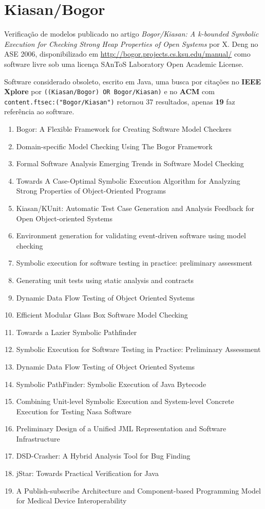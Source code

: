 \section{Kiasan/Bogor}

Verificação de modelos
publicado no artigo {\it Bogor/Kiasan: A k-bounded Symbolic Execution for Checking Strong Heap Properties of Open Systems}
por X. Deng
no ASE 2006,
disponibilizado em \url{http://bogor.projects.cs.ksu.edu/manual/}
como software livre
sob uma licença SAnToS Laboratory Open Academic License.

Software considerado obsoleto,
escrito em Java,
uma busca por citações no {\bf IEEE Xplore} por
\texttt{((Kiasan/Bogor) OR Bogor/Kiasan)}
e no {\bf ACM} com
\texttt{content.ftsec:("Bogor/Kiasan")}
retornou
37 resultados, apenas
{\bf 19} faz referência ao software.

\begin{enumerate}
\item Bogor: A Flexible Framework for Creating Software Model Checkers
\item Domain-specific Model Checking Using The Bogor Framework
\item Formal Software Analysis Emerging Trends in Software Model Checking
\item Towards A Case-Optimal Symbolic Execution Algorithm for Analyzing Strong Properties of Object-Oriented Programs
\item Kiasan/KUnit: Automatic Test Case Generation and Analysis Feedback for Open Object-oriented Systems
\item Environment generation for validating event-driven software using model checking
\item Symbolic execution for software testing in practice: preliminary assessment
\item Generating unit tests using static analysis and contracts
\item Dynamic Data Flow Testing of Object Oriented Systems
\item Efficient Modular Glass Box Software Model Checking
\item Towards a Lazier Symbolic Pathfinder
\item Symbolic Execution for Software Testing in Practice: Preliminary Assessment
\item Dynamic Data Flow Testing of Object Oriented Systems
\item Symbolic PathFinder: Symbolic Execution of Java Bytecode
\item Combining Unit-level Symbolic Execution and System-level Concrete Execution for Testing Nasa Software
\item Preliminary Design of a Unified JML Representation and Software Infrastructure
\item DSD-Crasher: A Hybrid Analysis Tool for Bug Finding
\item jStar: Towards Practical Verification for Java
\item A Publish-subscribe Architecture and Component-based Programming Model for Medical Device Interoperability
\end{enumerate}


